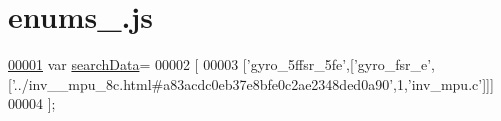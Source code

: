 \hypertarget{enums__2_8js_source}{}\section{enums\+\_.\+js}
\label{enums__2_8js_source}

\begin{DoxyCode}
\hypertarget{enums__2_8js_source.tex_l00001}{}\hyperlink{enums__2_8js_ad01a7523f103d6242ef9b0451861231e}{00001} var \hyperlink{enums__2_8js_ad01a7523f103d6242ef9b0451861231e}{searchData}=
00002 [
00003   [\textcolor{stringliteral}{'gyro\_5ffsr\_5fe'},[\textcolor{stringliteral}{'gyro\_fsr\_e'},[\textcolor{stringliteral}{'../inv\_\_mpu\_8c.html#a83acdc0eb37e8bfe0c2ae2348ded0a90'},1,\textcolor{stringliteral}{'inv\_mpu.c'}]]]
00004 ];
\end{DoxyCode}

